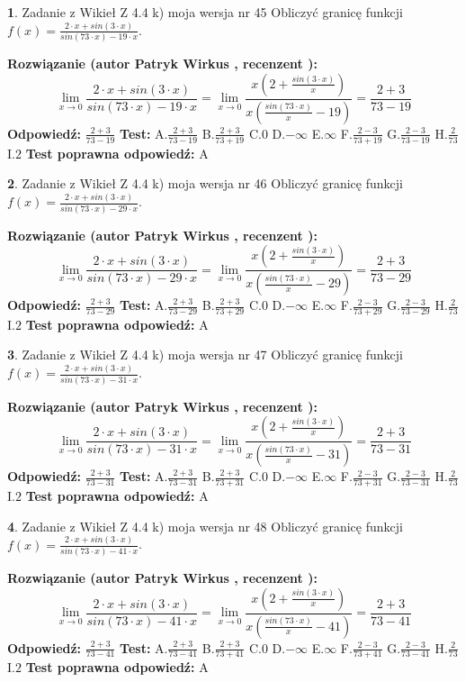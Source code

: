 \documentclass[12pt, a4paper]{article}
\theoremstyle{definition} %
\newtheorem{zad}{}
\newcommand{\zadStart}[1]{\begin{zad}#1\newline}
\newcommand{\zadStop}{\end{zad}}
\newcommand{\rozwStart}[2]{\noindent \textbf{Rozwiązanie (autor #1 , recenzent #2): }\newline}
\newcommand{\rozwStop}{\newline}
\newcommand{\odpStart}{\noindent \textbf{Odpowiedź:}\newline}
\newcommand{\odpStop}{\newline}
\newcommand{\testStart}{\noindent \textbf{Test:}\newline}
\newcommand{\testStop}{\newline}
\newcommand{\kluczStart}{\noindent \textbf{Test poprawna odpowiedź:}\newline}
\newcommand{\kluczStop}{\newline}
\begin{document}
\zadStart{Zadanie z Wikieł Z 4.4 k) moja wersja nr 45}
Obliczyć granicę funkcji $f(x)=\frac{2\cdot x +sin(3\cdot x)}{sin(73\cdot x) -19\cdot x}$.
\zadStop
\rozwStart{Patryk Wirkus}{}
$$\lim\limits_{x\to 0}\frac{2\cdot x +sin(3\cdot x)}{sin(73\cdot x) -19\cdot x}
=\lim\limits_{x\to 0}\frac{x(2+\frac{sin(3\cdot x)}{x})}{x(\frac{sin(73\cdot x)}{x}-19)}
=\frac{2+3}{73-19}$$
\rozwStop
\odpStart
$\frac{2+3}{73-19}$
\odpStop
\testStart
A.$\frac{2+3}{73-19}$
B.$\frac{2+3}{73+19}$
C.$0$
D.$-\infty$
E.$\infty$
F.$\frac{2-3}{73+19}$
G.$\frac{2-3}{73-19}$
H.$\frac{2}{73}$
I.$2$
\testStop
\kluczStart
A
\kluczStop



\zadStart{Zadanie z Wikieł Z 4.4 k) moja wersja nr 46}
Obliczyć granicę funkcji $f(x)=\frac{2\cdot x +sin(3\cdot x)}{sin(73\cdot x) -29\cdot x}$.
\zadStop
\rozwStart{Patryk Wirkus}{}
$$\lim\limits_{x\to 0}\frac{2\cdot x +sin(3\cdot x)}{sin(73\cdot x) -29\cdot x}
=\lim\limits_{x\to 0}\frac{x(2+\frac{sin(3\cdot x)}{x})}{x(\frac{sin(73\cdot x)}{x}-29)}
=\frac{2+3}{73-29}$$
\rozwStop
\odpStart
$\frac{2+3}{73-29}$
\odpStop
\testStart
A.$\frac{2+3}{73-29}$
B.$\frac{2+3}{73+29}$
C.$0$
D.$-\infty$
E.$\infty$
F.$\frac{2-3}{73+29}$
G.$\frac{2-3}{73-29}$
H.$\frac{2}{73}$
I.$2$
\testStop
\kluczStart
A
\kluczStop



\zadStart{Zadanie z Wikieł Z 4.4 k) moja wersja nr 47}
Obliczyć granicę funkcji $f(x)=\frac{2\cdot x +sin(3\cdot x)}{sin(73\cdot x) -31\cdot x}$.
\zadStop
\rozwStart{Patryk Wirkus}{}
$$\lim\limits_{x\to 0}\frac{2\cdot x +sin(3\cdot x)}{sin(73\cdot x) -31\cdot x}
=\lim\limits_{x\to 0}\frac{x(2+\frac{sin(3\cdot x)}{x})}{x(\frac{sin(73\cdot x)}{x}-31)}
=\frac{2+3}{73-31}$$
\rozwStop
\odpStart
$\frac{2+3}{73-31}$
\odpStop
\testStart
A.$\frac{2+3}{73-31}$
B.$\frac{2+3}{73+31}$
C.$0$
D.$-\infty$
E.$\infty$
F.$\frac{2-3}{73+31}$
G.$\frac{2-3}{73-31}$
H.$\frac{2}{73}$
I.$2$
\testStop
\kluczStart
A
\kluczStop



\zadStart{Zadanie z Wikieł Z 4.4 k) moja wersja nr 48}
Obliczyć granicę funkcji $f(x)=\frac{2\cdot x +sin(3\cdot x)}{sin(73\cdot x) -41\cdot x}$.
\zadStop
\rozwStart{Patryk Wirkus}{}
$$\lim\limits_{x\to 0}\frac{2\cdot x +sin(3\cdot x)}{sin(73\cdot x) -41\cdot x}
=\lim\limits_{x\to 0}\frac{x(2+\frac{sin(3\cdot x)}{x})}{x(\frac{sin(73\cdot x)}{x}-41)}
=\frac{2+3}{73-41}$$
\rozwStop
\odpStart
$\frac{2+3}{73-41}$
\odpStop
\testStart
A.$\frac{2+3}{73-41}$
B.$\frac{2+3}{73+41}$
C.$0$
D.$-\infty$
E.$\infty$
F.$\frac{2-3}{73+41}$
G.$\frac{2-3}{73-41}$
H.$\frac{2}{73}$
I.$2$
\testStop
\kluczStart
A
\kluczStop
\end{document}
